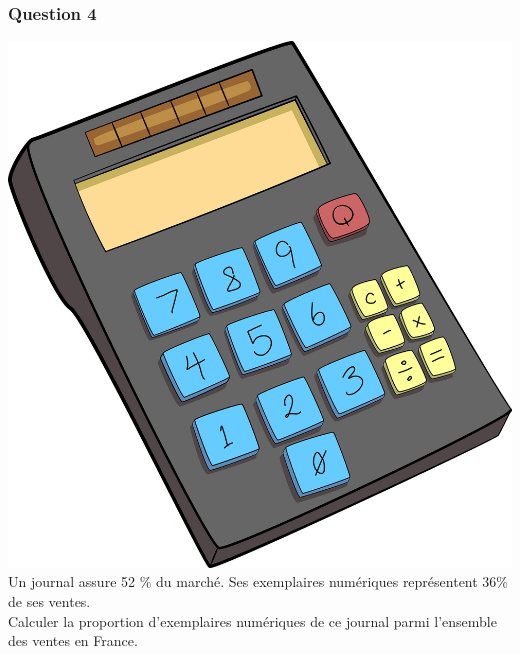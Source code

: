 \documentclass[15pt, mathserif]{beamer}
\begin{document}
\begin{frame} 
	\frametitle{Question 4}
\includegraphics[scale=0.01]{calculatrice} Un journal assure 52 \% du marché. Ses exemplaires numériques représentent 36\% de ses ventes. \\ Calculer la proportion d'exemplaires numériques de ce journal parmi l'ensemble des ventes en France.\end{frame}
\end{document}
